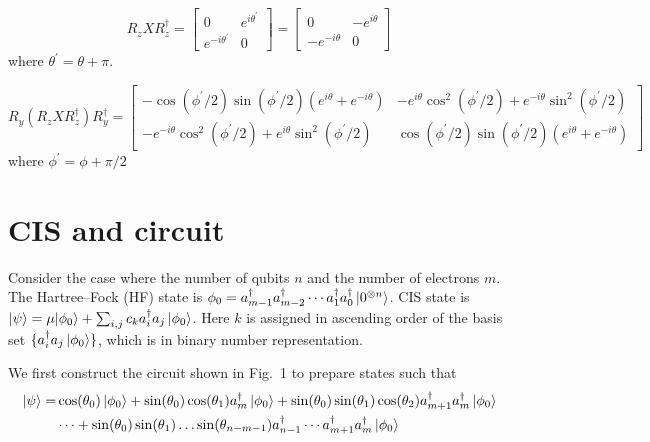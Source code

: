 \documentclass[11pt, oneside]{article}   	%
\begin{document}
\begin{equation}
R_z X R^{\dagger}_z
= 
\begin{bmatrix}
0 & e^{i \theta^{\prime}}  \\
e^{-i \theta^{\prime}}  & 0
\end{bmatrix}
= 
\begin{bmatrix}
0 & -e^{i \theta}  \\
-e^{-i \theta}  & 0
\end{bmatrix}
\end{equation}
where $\theta^{\prime} = \theta + \pi$.

\begin{equation}
R_y (R_z X R^{\dagger}_z) R^{\dagger}_y
= 
\begin{bmatrix}
-\cos(\phi^{\prime}/2) \sin(\phi^{\prime}/2) (e^{i \theta} + e^{-i \theta} ) & -e^{i \theta} \cos^2(\phi^{\prime}/2) + e^{-i \theta} \sin^2(\phi^{\prime}/2) \\
-e^{-i \theta} \cos^2(\phi^{\prime}/2) + e^{i \theta} \sin^2(\phi^{\prime}/2) & \cos(\phi^{\prime}/2) \sin(\phi^{\prime}/2) (e^{i \theta} + e^{-i \theta} ) 
\end{bmatrix}
\end{equation}
where $\phi^{\prime} = \phi + \pi/2$

\section{CIS and circuit}
Consider the case where the number of qubits $n$ and the number of electrons $m$.
The Hartree–Fock (HF) state is $\phi_0 = a^{\dagger}_{m-1} a^{\dagger}_{m-2} \cdots a^{\dagger}_{1} a^{\dagger}_{0} \ket{0^{\otimes n}}$.
CIS state is $\ket{\psi} = \mu {\ket{\phi_0}} + \sum_{i, j} c_k a^{\dagger}_i a_j \ket{\phi_0}$.
Here $k$ is assigned in ascending order of the basis set $\{ a^{\dagger}_i a_j \ket{\phi_0} \}$, which is in binary number representation.

We first construct the circuit shown in Fig.~1 to prepare states such that 
\begin{align}
\ket{\psi} 
=&\cos(\theta_0) \ket{\phi_0} + \sin(\theta_0) \cos(\theta_1) a^{\dagger}_m \ket{\phi_0} + \sin(\theta_0) \sin(\theta_1) \cos(\theta_2) a^{\dagger}_{m+1} a^{\dagger}_m \ket{\phi_0}  \\
& \cdots + \sin(\theta_0) \sin(\theta_1) \dots \sin(\theta_{n-m-1}) a^{\dagger}_{n-1} \cdots a^{\dagger}_{m+1} a^{\dagger}_m \ket{\phi_0} 
\end{align}
\end{document}
